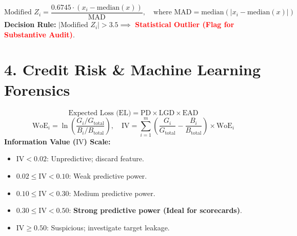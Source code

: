 \begin{tcolorbox}[colback=amberbg, colframe=amberborder, title={\textbf{Robust Outlier Detection: Modified $Z$-Score}}]
\begin{equation*}
\text{Modified } Z_i = \frac{0.6745 \cdot (x_i - \text{median}(x))}{\text{MAD}}, \quad \text{where } \text{MAD} = \text{median}(|x_i - \text{median}(x)|)
\end{equation*}
\textbf{Decision Rule:} $|\text{Modified } Z_i| > 3.5 \implies$ \textcolor{red}{\textbf{Statistical Outlier (Flag for Substantive Audit)}}.
\end{tcolorbox}

\section*{4. Credit Risk \& Machine Learning Forensics}

\begin{tcolorbox}[colback=primarylight, colframe=primarydark, title={\textbf{Credit Risk Expected Loss \& Information Value}}]
\begin{equation*}
\text{Expected Loss (EL)} = \text{PD} \times \text{LGD} \times \text{EAD}
\end{equation*}
\begin{equation*}
\text{WoE}_i = \ln\left(\frac{G_i / G_{\text{total}}}{B_i / B_{\text{total}}}\right), \quad \text{IV} = \sum_{i=1}^m \left(\frac{G_i}{G_{\text{total}}} - \frac{B_i}{B_{\text{total}}}\right) \times \text{WoE}_i
\end{equation*}
\textbf{Information Value ($\text{IV}$) Scale:}
\begin{itemize}
    \item $\text{IV} < 0.02$: Unpredictive; discard feature.
    \item $0.02 \le \text{IV} < 0.10$: Weak predictive power.
    \item $0.10 \le \text{IV} < 0.30$: Medium predictive power.
    \item $0.30 \le \text{IV} < 0.50$: \textcolor{tealdef}{\textbf{Strong predictive power (Ideal for scorecards)}}.
    \item $\text{IV} \ge 0.50$: Suspicious; investigate target leakage.
\end{itemize}
\end{tcolorbox}

